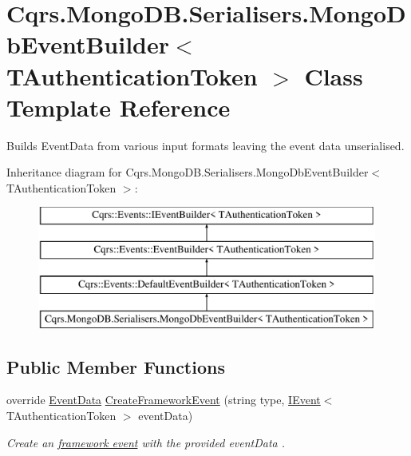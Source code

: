 \hypertarget{classCqrs_1_1MongoDB_1_1Serialisers_1_1MongoDbEventBuilder}{}\section{Cqrs.\+Mongo\+D\+B.\+Serialisers.\+Mongo\+Db\+Event\+Builder$<$ T\+Authentication\+Token $>$ Class Template Reference}
\label{classCqrs_1_1MongoDB_1_1Serialisers_1_1MongoDbEventBuilder}


Builds Event\+Data from various input formats leaving the event data unserialised.  


Inheritance diagram for Cqrs.\+Mongo\+D\+B.\+Serialisers.\+Mongo\+Db\+Event\+Builder$<$ T\+Authentication\+Token $>$\+:\begin{figure}[H]
\begin{center}
\leavevmode
\includegraphics[height=4.000000cm]{classCqrs_1_1MongoDB_1_1Serialisers_1_1MongoDbEventBuilder}
\end{center}
\end{figure}
\subsection*{Public Member Functions}
\begin{DoxyCompactItemize}
\item 
override \hyperlink{classCqrs_1_1Events_1_1EventData}{Event\+Data} \hyperlink{classCqrs_1_1MongoDB_1_1Serialisers_1_1MongoDbEventBuilder_a06afbb994fd3f679f275dea3d1d60c6e_a06afbb994fd3f679f275dea3d1d60c6e}{Create\+Framework\+Event} (string type, \hyperlink{interfaceCqrs_1_1Events_1_1IEvent}{I\+Event}$<$ T\+Authentication\+Token $>$ event\+Data)
\begin{DoxyCompactList}\small\item\em Create an \hyperlink{}{framework event} with the provided {\itshape event\+Data} . \end{DoxyCompactList}\end{DoxyCompactItemize}
